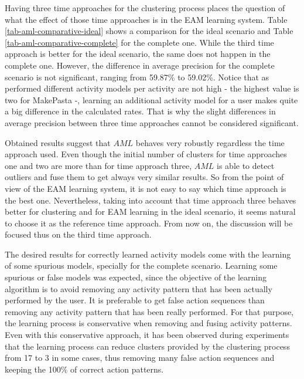 Having three time approaches for the clustering process places the question of what the effect of those time approaches is in the EAM learning system. Table \ref{tab-aml-comparative-ideal} shows a comparison for the ideal scenario and Table \ref{tab-aml-comparative-complete} for the complete one. While the third time approach is better for the ideal scenario, the same does not happen in the complete one. However, the difference in average precision for the complete scenario is not significant, ranging from 59.87\% to 59.02\%. Notice that as performed different activity models per activity are not high - the highest value is two for MakePasta -, learning an additional activity model for a user makes quite a big difference in the calculated rates. That is why the slight differences in average precision between three time approaches cannot be considered significant. %

Obtained results suggest that $AML$ behaves very robustly regardless the time approach used. Even though the initial number of clusters for time approaches one and two are more than for time approach three, $AML$ is able to detect outliers and fuse them to get always very similar results. So from the point of view of the EAM learning system, it is not easy to say which time approach is the best one. Nevertheless, taking into account that time approach three behaves better for clustering and for EAM learning in the ideal scenario, it seems natural to choose it as the reference time approach. From now on, the discussion will be focused thus on the third time approach.

The desired results for correctly learned activity models come with the learning of some spurious models, specially for the complete scenario. Learning some spurious or false models was expected, since the objective of the learning algorithm is to avoid removing any activity pattern that has been actually performed by the user. It is preferable to get false action sequences than removing any activity pattern that has been really performed. For that purpose, the learning process is conservative when removing and fusing activity patterns. Even with this conservative approach, it has been observed during experiments that the learning process can reduce clusters provided by the clustering process from 17 to 3 in some cases, thus removing many false action sequences and keeping the 100\% of correct action patterns.


